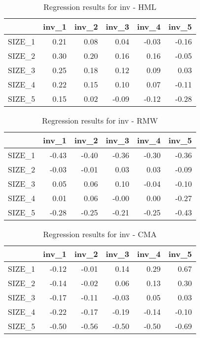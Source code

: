 \begin{table}[ht]
\centering
\caption{Regression results for inv - HML} 
\begin{tabular}{rrrrrr}
  \hline
 & inv\_1 & inv\_2 & inv\_3 & inv\_4 & inv\_5 \\ 
  \hline
SIZE\_1 & 0.21 & 0.08 & 0.04 & -0.03 & -0.16 \\ 
  SIZE\_2 & 0.30 & 0.20 & 0.16 & 0.16 & -0.05 \\ 
  SIZE\_3 & 0.25 & 0.18 & 0.12 & 0.09 & 0.03 \\ 
  SIZE\_4 & 0.22 & 0.15 & 0.10 & 0.07 & -0.11 \\ 
  SIZE\_5 & 0.15 & 0.02 & -0.09 & -0.12 & -0.28 \\ 
   \hline
\end{tabular}
\end{table}


\begin{table}[ht]
\centering
\caption{Regression results for inv - RMW} 
\begin{tabular}{rrrrrr}
  \hline
 & inv\_1 & inv\_2 & inv\_3 & inv\_4 & inv\_5 \\ 
  \hline
SIZE\_1 & -0.43 & -0.40 & -0.36 & -0.30 & -0.36 \\ 
  SIZE\_2 & -0.03 & -0.01 & 0.03 & 0.03 & -0.09 \\ 
  SIZE\_3 & 0.05 & 0.06 & 0.10 & -0.04 & -0.10 \\ 
  SIZE\_4 & 0.01 & 0.06 & -0.00 & 0.00 & -0.27 \\ 
  SIZE\_5 & -0.28 & -0.25 & -0.21 & -0.25 & -0.43 \\ 
   \hline
\end{tabular}
\end{table}


\begin{table}[ht]
\centering
\caption{Regression results for inv - CMA} 
\begin{tabular}{rrrrrr}
  \hline
 & inv\_1 & inv\_2 & inv\_3 & inv\_4 & inv\_5 \\ 
  \hline
SIZE\_1 & -0.12 & -0.01 & 0.14 & 0.29 & 0.67 \\ 
  SIZE\_2 & -0.14 & -0.02 & 0.06 & 0.13 & 0.30 \\ 
  SIZE\_3 & -0.17 & -0.11 & -0.03 & 0.05 & 0.03 \\ 
  SIZE\_4 & -0.22 & -0.17 & -0.19 & -0.14 & -0.10 \\ 
  SIZE\_5 & -0.50 & -0.56 & -0.50 & -0.50 & -0.69 \\ 
   \hline
\end{tabular}
\end{table}


